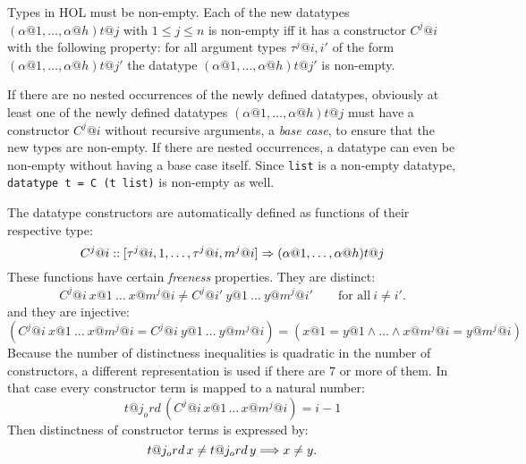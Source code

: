 \medskip

Types in HOL must be non-empty. Each of the new datatypes
$(\alpha@1,\ldots,\alpha@h)t@j$ with $1 \le j \le n$ is non-empty iff it has a
constructor $C^j@i$ with the following property: for all argument types
$\tau^j@{i,i'}$ of the form $(\alpha@1,\ldots,\alpha@h)t@{j'}$ the datatype
$(\alpha@1,\ldots,\alpha@h)t@{j'}$ is non-empty.

If there are no nested occurrences of the newly defined datatypes, obviously
at least one of the newly defined datatypes $(\alpha@1,\ldots,\alpha@h)t@j$
must have a constructor $C^j@i$ without recursive arguments, a \emph{base
  case}, to ensure that the new types are non-empty. If there are nested
occurrences, a datatype can even be non-empty without having a base case
itself. Since {\tt list} is a non-empty datatype, {\tt datatype t = C (t
  list)} is non-empty as well.

The datatype constructors are automatically defined as functions of their
respective type:
\[ C^j@i :: [\tau^j@{i,1},\dots,\tau^j@{i,m^j@i}] \To (\alpha@1,\dots,\alpha@h)t@j \]
These functions have certain {\em freeness} properties.  They are distinct:
\[
C^j@i~x@1~\dots~x@{m^j@i} \neq C^j@{i'}~y@1~\dots~y@{m^j@{i'}} \qquad
\mbox{for all}~ i \neq i'.
\]
and they are injective:
\[
(C^j@i~x@1~\dots~x@{m^j@i} = C^j@i~y@1~\dots~y@{m^j@i}) =
(x@1 = y@1 \land \dots \land x@{m^j@i} = y@{m^j@i})
\]
Because the number of distinctness inequalities is quadratic in the number of
constructors, a different representation is used if there are $7$ or more of
them.  In that case every constructor term is mapped to a natural number:
\[
t@j_ord \, (C^j@i \, x@1 \, \dots \, x@{m^j@i}) = i - 1
\]
Then distinctness of constructor terms is expressed by:
\[
t@j_ord \, x \neq t@j_ord \, y \Longrightarrow x \neq y.
\]

